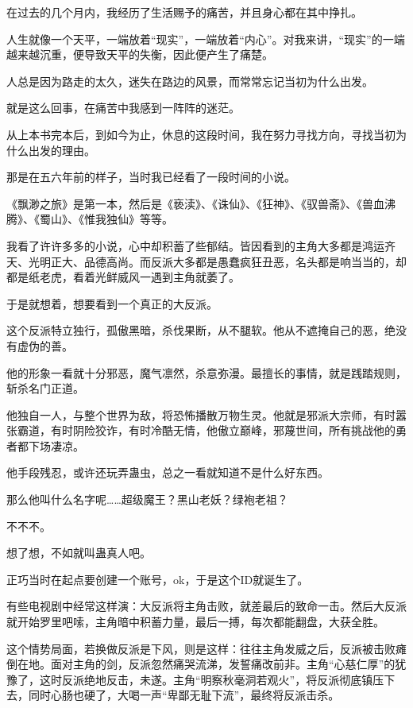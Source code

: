 

\begin{this_body}

在过去的几个月内，我经历了生活赐予的痛苦，并且身心都在其中挣扎。

人生就像一个天平，一端放着“现实”，一端放着“内心”。对我来讲，“现实”的一端越来越沉重，便导致天平的失衡，因此便产生了痛楚。

人总是因为路走的太久，迷失在路边的风景，而常常忘记当初为什么出发。

就是这么回事，在痛苦中我感到一阵阵的迷茫。

从上本书完本后，到如今为止，休息的这段时间，我在努力寻找方向，寻找当初为什么出发的理由。

那是在五六年前的样子，当时我已经看了一段时间的小说。

《飘渺之旅》是第一本，然后是《亵渎》、《诛仙》、《狂神》、《驭兽斋》、《兽血沸腾》、《蜀山》、《惟我独仙》等等。

我看了许许多多的小说，心中却积蓄了些郁结。皆因看到的主角大多都是鸿运齐天、光明正大、品德高尚。而反派大多都是愚蠢疯狂丑恶，名头都是响当当的，却都是纸老虎，看着光鲜威风一遇到主角就萎了。

于是就想着，想要看到一个真正的大反派。

这个反派特立独行，孤傲黑暗，杀伐果断，从不腿软。他从不遮掩自己的恶，绝没有虚伪的善。

他的形象一看就十分邪恶，魔气凛然，杀意弥漫。最擅长的事情，就是践踏规则，斩杀名门正道。

他独自一人，与整个世界为敌，将恐怖播散万物生灵。他就是邪派大宗师，有时嚣张霸道，有时阴险狡诈，有时冷酷无情，他傲立巅峰，邪蔑世间，所有挑战他的勇者都下场凄凉。

他手段残忍，或许还玩弄蛊虫，总之一看就知道不是什么好东西。

那么他叫什么名字呢……超级魔王？黑山老妖？绿袍老祖？

不不不。

想了想，不如就叫蛊真人吧。

正巧当时在起点要创建一个账号，ok，于是这个ID就诞生了。

有些电视剧中经常这样演：大反派将主角击败，就差最后的致命一击。然后大反派就开始罗里吧嗦，主角暗中积蓄力量，最后一搏，每次都能翻盘，大获全胜。

这个情势局面，若换做反派是下风，则是这样：往往主角发威之后，反派被击败瘫倒在地。面对主角的剑，反派忽然痛哭流涕，发誓痛改前非。主角“心慈仁厚”的犹豫了，这时反派绝地反击，未遂。主角“明察秋毫洞若观火”，将反派彻底镇压下去，同时心肠也硬了，大喝一声“卑鄙无耻下流”，最终将反派击杀。


\end{this_body}
